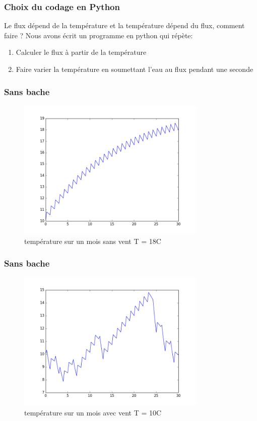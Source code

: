 \documentclass{beamer}
\begin{document}
  \begin{frame}
   \frametitle{Choix du codage en Python}
   Le flux dépend de la température et la température dépend du flux, comment faire ?
Nous avons écrit un programme en python qui répète:
    \begin{enumerate}
     \item Calculer le flux à partir de la température
     \item Faire varier la température en soumettant l’eau au flux pendant une seconde

    \end{enumerate}

  \end{frame}
  \begin{frame}
   \frametitle{Sans bache}
   \begin{figure}[ht!]
    \centering
    \includegraphics[width=90mm]{sans_bache_sans_vent.png}
    \caption{température sur un mois sans vent T = 18C \label{overflow}}
   \end{figure}
  \end{frame}
  \begin{frame}
  \frametitle{Sans bache}
   \begin{figure}[ht!]
    \centering
    \includegraphics[width=90mm]{0b_v.png}
    \caption{température sur un mois avec vent T = 10C \label{overflow}}
   \end{figure}
  \end{frame}
\end{document}
